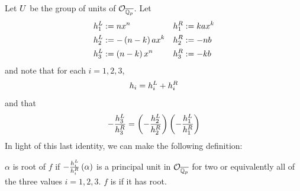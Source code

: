 \documentclass[../main.tex]{subfiles}
\begin{document}
Let $U$ be the group of units of $\mathcal{O}_{\overline{\mathbb{Q}_p}}$.
Let 
\begin{align*}
  & 
  h_{1}^L := nx^n 
  &&
  h_{1}^R := kax^k
  \\
  & 
  h_{2}^L := -\left( n - k \right)ax^k
  &&
  h_{2}^R := -nb
  \\
  & 
  h_{3}^L := \left( n - k \right)x^n
  &&
  h_{3}^R := -kb
\end{align*}
and note that for each $i = 1, 2, 3$, 
\[
  h_{i} = h_{i}^L + h_{i}^R 
\]
and that 
\[
  -\frac{h_{3}^L}{h_{3}^R} = 
  \left(  
    -\frac{h_{2}^L}{h_{2}^R}
  \right) 
  \left(  
    -\frac{h_{1}^L}{h_{1}^R}
  \right)
\]
In light of this last identity, we can make the following definition:
\begin{definition}
  $\alpha$ is \textbf{\anex} root of $f$ if 
  $-\frac{h_{i}^L}{h_{i}^R}\left( \alpha \right)$ is a principal unit in $\mathcal{O}_{\overline{\mathbb{Q}_p}}$  
  for two or equivalently all of the three values $i = 1, 2, 3$.
  $f$ is \textbf{\ex} if it has \anex root.
\end{definition}
\end{document}
